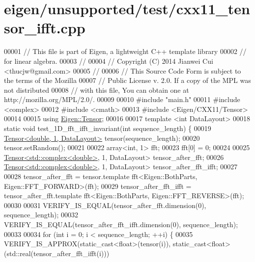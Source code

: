 \hypertarget{eigen_2unsupported_2test_2cxx11__tensor__ifft_8cpp_source}{}\section{eigen/unsupported/test/cxx11\+\_\+tensor\+\_\+ifft.cpp}
\label{eigen_2unsupported_2test_2cxx11__tensor__ifft_8cpp_source}

\begin{DoxyCode}
00001 \textcolor{comment}{// This file is part of Eigen, a lightweight C++ template library}
00002 \textcolor{comment}{// for linear algebra.}
00003 \textcolor{comment}{//}
00004 \textcolor{comment}{// Copyright (C) 2014 Jianwei Cui <thucjw@gmail.com>}
00005 \textcolor{comment}{//}
00006 \textcolor{comment}{// This Source Code Form is subject to the terms of the Mozilla}
00007 \textcolor{comment}{// Public License v. 2.0. If a copy of the MPL was not distributed}
00008 \textcolor{comment}{// with this file, You can obtain one at http://mozilla.org/MPL/2.0/.}
00009 
00010 \textcolor{preprocessor}{#include "main.h"}
00011 \textcolor{preprocessor}{#include <complex>}
00012 \textcolor{preprocessor}{#include <cmath>}
00013 \textcolor{preprocessor}{#include <Eigen/CXX11/Tensor>}
00014 
00015 \textcolor{keyword}{using} \hyperlink{class_eigen_1_1_tensor}{Eigen::Tensor};
00016 
00017 \textcolor{keyword}{template} <\textcolor{keywordtype}{int} DataLayout>
00018 \textcolor{keyword}{static} \textcolor{keywordtype}{void} test\_1D\_fft\_ifft\_invariant(\textcolor{keywordtype}{int} sequence\_length) \{
00019   \hyperlink{class_eigen_1_1_tensor}{Tensor<double, 1, DataLayout>} tensor(sequence\_length);
00020   tensor.setRandom();
00021 
00022   array<int, 1> fft;
00023   fft[0] = 0;
00024 
00025   \hyperlink{class_eigen_1_1_tensor}{Tensor<std::complex<double>}, 1, DataLayout> tensor\_after\_fft;
00026   \hyperlink{class_eigen_1_1_tensor}{Tensor<std::complex<double>}, 1, DataLayout> tensor\_after\_fft\_ifft;
00027 
00028   tensor\_after\_fft = tensor.template fft<Eigen::BothParts, Eigen::FFT\_FORWARD>(fft);
00029   tensor\_after\_fft\_ifft = tensor\_after\_fft.template fft<Eigen::BothParts, Eigen::FFT\_REVERSE>(fft);
00030 
00031   VERIFY\_IS\_EQUAL(tensor\_after\_fft.dimension(0), sequence\_length);
00032   VERIFY\_IS\_EQUAL(tensor\_after\_fft\_ifft.dimension(0), sequence\_length);
00033 
00034   \textcolor{keywordflow}{for} (\textcolor{keywordtype}{int} i = 0; i < sequence\_length; ++i) \{
00035     VERIFY\_IS\_APPROX(static\_cast<float>(tensor(i)), static\_cast<float>(std::real(tensor\_after\_fft\_ifft(i)))

\end{DoxyCode}
